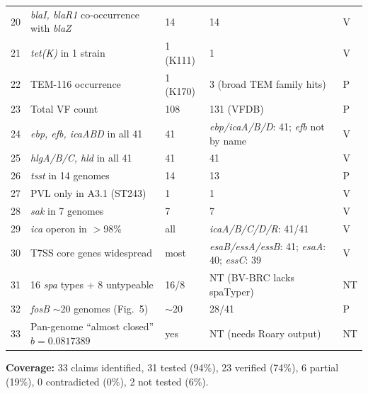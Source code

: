 \documentclass[11pt]{article}
\begin{document}
\begin{small}
\begin{longtable}{@{}p{0.5cm} p{7.5cm} p{2.5cm} p{2.5cm} p{1.2cm}@{}}
20 & \emph{blaI, blaR1} co-occurrence with \emph{blaZ} & 14 & 14 & V \\
21 & \emph{tet(K)} in 1 strain & 1 (K111) & 1 & V \\
22 & TEM-116 occurrence & 1 (K170) & 3 (broad TEM family hits) & P \\
23 & Total VF count & 108 & 131 (VFDB) & P \\
24 & \emph{ebp, efb, icaABD} in all 41 & 41 & \emph{ebp/icaA/B/D}: 41; \emph{efb} not by name & V \\
25 & \emph{hlgA/B/C, hld} in all 41 & 41 & 41 & V \\
26 & \emph{tsst} in 14 genomes & 14 & 13 & P \\
27 & PVL only in A3.1 (ST243) & 1 & 1 & V \\
28 & \emph{sak} in 7 genomes & 7 & 7 & V \\
29 & \emph{ica} operon in $>$98\% & all & \emph{icaA/B/C/D/R}: 41/41 & V \\
30 & T7SS core genes widespread & most & \emph{esaB/essA/essB}: 41; \emph{esaA}: 40; \emph{essC}: 39 & V \\
31 & 16 \emph{spa} types + 8 untypeable & 16/8 & NT (BV-BRC lacks spaTyper) & NT \\
32 & \emph{fosB} $\sim$20 genomes (Fig.\ 5) & $\sim$20 & 28/41 & P \\
33 & Pan-genome ``almost closed'' $b=0.0817389$ & yes & NT (needs Roary output) & NT \\
\bottomrule
\end{longtable}
\end{small}

\noindent \textbf{Coverage:} 33 claims identified, 31 tested (94\%), 23 verified (74\%), 6 partial (19\%), 0 contradicted (0\%), 2 not tested (6\%).
\end{document}
